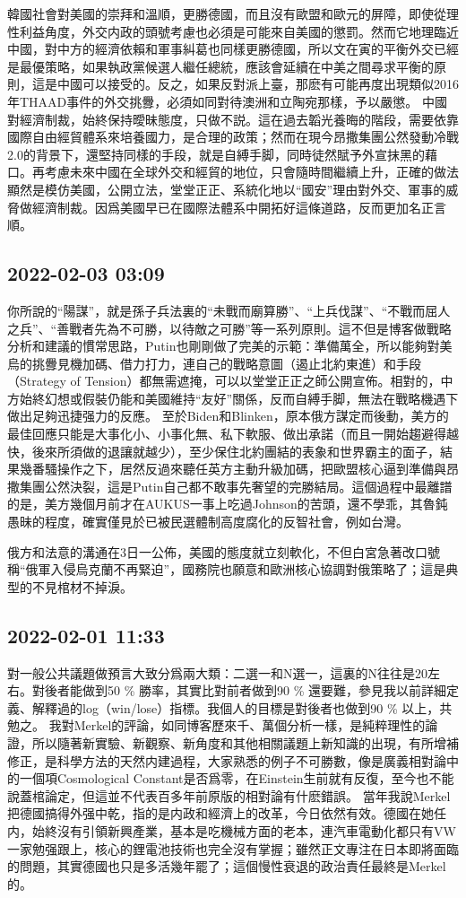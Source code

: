 \documentclass[twocolumn]{ctexart}
\begin{document}
韓國社會對美國的崇拜和溫順，更勝德國，而且沒有歐盟和歐元的屏障，即使從理性利益角度，外交内政的頭號考慮也必須是可能來自美國的懲罰。然而它地理臨近中國，對中方的經濟依賴和軍事糾葛也同樣更勝德國，所以文在寅的平衡外交已經是最優策略，如果執政黨候選人繼任總統，應該會延續在中美之間尋求平衡的原則，這是中國可以接受的。反之，如果反對派上臺，那麽有可能再度出現類似2016年THAAD事件的外交挑釁，必須如同對待澳洲和立陶宛那樣，予以嚴懲。
中國對經濟制裁，始終保持曖昧態度，只做不説。這在過去韜光養晦的階段，需要依靠國際自由經貿體系來培養國力，是合理的政策；然而在現今昂撒集團公然發動冷戰2.0的背景下，還堅持同樣的手段，就是自縛手脚，同時徒然賦予外宣抹黑的藉口。再考慮未來中國在全球外交和經貿的地位，只會隨時間繼續上升，正確的做法顯然是模仿美國，公開立法，堂堂正正、系統化地以“國安”理由對外交、軍事的威脅做經濟制裁。因爲美國早已在國際法體系中開拓好這條道路，反而更加名正言順。
\subsection*{2022-02-03 03:09}

你所說的“陽謀”，就是孫子兵法裏的“未戰而廟算勝”、“上兵伐謀”、“不戰而屈人之兵”、“善戰者先為不可勝，以待敵之可勝”等一系列原則。這不但是博客做戰略分析和建議的慣常思路，Putin也剛剛做了完美的示範：準備萬全，所以能夠對美烏的挑釁見機加碼、借力打力，連自己的戰略意圖（遏止北約東進）和手段（Strategy of Tension）都無需遮掩，可以以堂堂正正之師公開宣佈。相對的，中方始終幻想或假裝仍能和美國維持“友好”關係，反而自縛手脚，無法在戰略機遇下做出足夠迅捷强力的反應。
至於Biden和Blinken，原本俄方謀定而後動，美方的最佳回應只能是大事化小、小事化無、私下軟服、做出承諾（而且一開始趨避得越快，後來所須做的退讓就越少），至少保住北約團結的表象和世界霸主的面子，結果幾番騷操作之下，居然反過來聽任英方主動升級加碼，把歐盟核心逼到準備與昂撒集團公然決裂，這是Putin自己都不敢事先奢望的完勝結局。這個過程中最離譜的是，美方幾個月前才在AUKUS一事上吃過Johnson的苦頭，還不學乖，其魯鈍愚昧的程度，確實僅見於已被民選體制高度腐化的反智社會，例如台灣。

俄方和法意的溝通在3日一公佈，美國的態度就立刻軟化，不但白宮急著改口號稱“俄軍入侵烏克蘭不再緊迫”，國務院也願意和歐洲核心協調對俄策略了；這是典型的不見棺材不掉淚。
\subsection*{2022-02-01 11:33}

對一般公共議題做預言大致分爲兩大類：二選一和N選一，這裏的N往往是20左右。對後者能做到50 \% 勝率，其實比對前者做到90 \% 還要難，參見我以前詳細定義、解釋過的log（win/lose）指標。我個人的目標是對後者也做到90 \% 以上，共勉之。
我對Merkel的評論，如同博客歷來千、萬個分析一樣，是純粹理性的論證，所以隨著新實驗、新觀察、新角度和其他相關議題上新知識的出現，有所增補修正，是科學方法的天然内建過程，大家熟悉的例子不可勝數，像是廣義相對論中的一個項Cosmological Constant是否爲零，在Einstein生前就有反復，至今也不能說蓋棺論定，但這並不代表百多年前原版的相對論有什麽錯誤。
當年我說Merkel把德國搞得外强中乾，指的是内政和經濟上的改革，今日依然有效。德國在她任内，始終沒有引領新興產業，基本是吃機械方面的老本，連汽車電動化都只有VW一家勉强跟上，核心的鋰電池技術也完全沒有掌握；雖然正文專注在日本即將面臨的問題，其實德國也只是多活幾年罷了；這個慢性衰退的政治責任最終是Merkel的。
\end{document}

